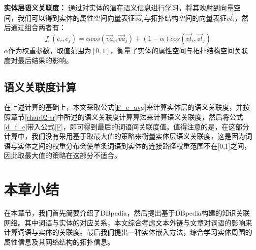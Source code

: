 \textbf{实体层语义关联度：}
通过对实体的潜在语义信息进行学习，将其映射到向量空间，我们可以得到实体的属性空间向量表征$\vec {va}_i$与拓扑结构空间的向量表征$\vec {vt}_i$，然后通过组合两者有：
\begin{equation}
    \label{d_f_e}
    f_e(e_i, e_j) = \alpha cos({\vec {va}_i, \vec {va}_j}) 
    + (1-\alpha)cos(\vec {vt}_i,\vec {vt}_j)
\end{equation}
\noindent $\alpha$作为权重参数，取值范围为$[0,1]$，衡量了实体的属性空间与拓扑结构空间关联度对最后结果的影响。

\subsection{语义关联度计算}
在上述计算的基础上，本文采取公式\ref{F_e_avg}来计算实体层的语义关联度，并按照章节\ref{chap02-sr}中所述的语义关联度计算算法来计算语义关联度，然后将公式\ref{d_f_e}带入公式\ref{F}，即可得到最后的词语间关联度值。值得注意的是，在这部分计算中，我们没有采用基于取最大值的策略来衡量实体层语义关联度，这是因为词语与实体之间的权重分布会使单条词语到实体的连接路径权重范围不在[0,1]之间，因此取最大值的策略在这部分不适合。

\section{本章小结}

在本章节，我们首先简要介绍了DBpedia，然后提出基于DBpedia构建的知识关联网络。其中词语与实体的对应关系，本文综合考虑文本外链与文章对词语的影响来计算词语与实体的关联度。最后我们提出一种实体嵌入方法，综合学习实体周围的属性信息及其网络结构的拓扑信息。
